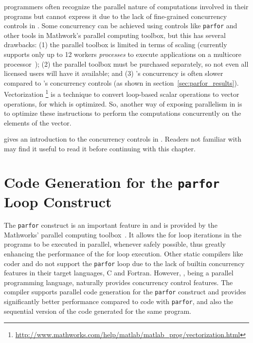 \matlab programmers often recognize the parallel nature of computations involved
in their programs but cannot express it due to the lack of fine-grained
concurrency controls in \matlab. Some concurrency can be achieved using controls
like \verb|parfor| and other tools in Mathwork's parallel computing toolbox, but
this has several drawbacks:  (1) the parallel toolbox is limited in terms of
scaling (\matlab currently supports only up to 12 workers \emph{processes} to
execute applications on a multicore processor~\cite{pct}); (2) the parallel
toolbox must be purchased separately, so not even all licensed \matlab users
will have it available; and (3) \matlab's concurrency is often slower compared
to \xten's concurrency controls (as shown in section~\ref{sec:parfor_results}).
Vectorization
\footnote{\url{http://www.mathworks.com/help/matlab/matlab_prog/vectorization.html}}
is a technique to convert loop-based scalar operations to vector operations, for
which \matlab is optimized.   So, another way of exposing parallelism in \matlab
is to optimize these instructions to perform the computations concurrently on
the elements of the vector.

 gives an introduction to the concurrency controls in \xten.
Readers not familiar with \xten may find it useful to read it before continuing
with this chapter.



\section{Code Generation for the \matlab \texttt{parfor} Loop Construct}

The \matlab \texttt{parfor} construct is an important feature in \matlab and is
provided by the Mathworks' parallel computing toolbox~\cite{pct}. It allows the
for loop iterations in the \matlab programs to be executed in parallel, whenever
safely possible, thus greatly enhancing the performance of the for loop
execution. Other static \matlab compilers like \matlab coder and \mctwofor do
not support the \texttt{parfor} loop due to the lack of builtin concurrency
features in their target languages, C and Fortran. However, \xten, being a
parallel programming language, naturally provides concurrency control features.
The \mixten compiler supports parallel code generation for the \matlab
\texttt{parfor} construct and provides significantly better performance compared
to \matlab code with \texttt{parfor}, and also the sequential version of the
\xten code generated for the same program.   

